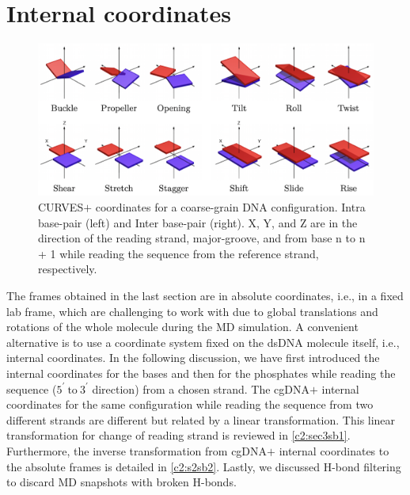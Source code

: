 \section{Internal coordinates}\label{c2:sec2}
\begin{figure}[htb]
\begin{center}
\centering\includegraphics[scale=0.65]{images/IC.png}
\centering\caption{
CURVES$+$ coordinates for a coarse-grain DNA configuration. Intra base-pair (left) and Inter base-pair (right).
X, Y, and Z are in the direction of the reading strand, major-groove, and from base n to n + 1 while reading the sequence from the reference strand, respectively.
}
\label{c2:fig_IC}
\end{center}
\end{figure}

The frames obtained in the last section are in absolute coordinates, i.e., in a fixed lab frame, which are challenging to work with due to global
translations and rotations of the whole molecule during the MD simulation.
A convenient alternative is to use a coordinate system fixed on the dsDNA molecule itself, i.e., internal coordinates. 
In the following discussion, we have first introduced the internal coordinates for the bases and then for the phosphates while reading the sequence ($5^\prime \ \text{to} \ 3^\prime$ direction) from a chosen strand.
The cgDNA$+$ internal coordinates for the same configuration while reading the sequence from two different strands are different but related by a linear transformation. This linear transformation for change of reading strand is reviewed in \cref{c2:sec3sb1}.
Furthermore, the inverse transformation from cgDNA$+$ internal coordinates to the absolute frames is detailed in \cref{c2:s2sb2}.
Lastly, we discussed H-bond filtering to discard MD snapshots with broken H-bonds.

